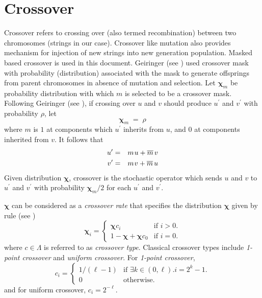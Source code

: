 \section{Crossover}
Crossover refers to crossing over (also termed recombination) between two chromosomes (strings in our case). Crossover like mutation also provides mechanism for injection of new strings into new generation population. Masked based crossover is used in this document. Geiringer (see \cite{Geiringer1944}) used crossover mask with probability (distribution) associated with the mask to generate offsprings from parent chromosomes in absence of mutation and selection. Let $\bm{\chi}_m$ be probability distribution with which $m$ is selected to be a crossover mask.
Following Geiringer (see \cite{Geiringer1944}), if crossing over $u$ and $v$ should produce $u^\prime$ and $v^\prime$ with probability $\rho$, let
\[
\bm{\chi}_m \; = \; \rho
\]
where $m$ is $1$ at components which $u^\prime$ inherits from $u$, and
$0$ at components inherited from $v$.  It follows that\\[-0.3in]
\begin{eqnarray*}
u^\prime & = & m \nudge u + \overline{m} \nudge\nudge v \\
v^\prime & = & m \nudge v + \overline{m} \nudge\nudge u
\end{eqnarray*}
Given distribution $\bm{\chi}$, crossover is the stochastic operator which
sends $u$ and $v$ to $u^\prime$ and $v^\prime$ with probability $\bm{\chi}_m/2$ for each $u^\prime$ and $v^\prime$.

$\bm{\chi}$ can be considered as a {\em crossover rate} that specifies the distribution $\bm{\chi}$ given by rule (see \cite{VoseWright1998})
\[
  \bm{\chi}_i =\begin{cases}
    \bm{\chi}  c_i & \text{if $i>0$}.\\
    1 - \bm{\chi} + \bm{\chi}  c_0 & \text{if $i = 0$}.
  \end{cases}
\]
where $c \in \Lambda$ is referred to as {\em crossover type}. Classical crossover types include {\em 1-point crossover} and {\em uniform crossover}. For {\em 1-point crossover},
\[
  c_i =\begin{cases}
    1/(\ell - 1) & \text{if $\exists k \in (0, \ell).i = 2^k - 1$}.\\
    0 & \text{otherwise}.
  \end{cases}
\]
and for uniform crossover, $c_i = 2^{-\ell}$.


